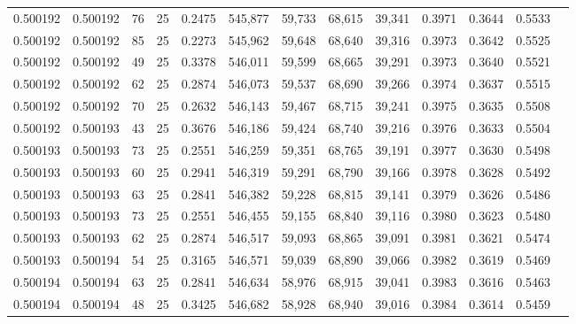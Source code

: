 \begin{tabular}{rrrrrrrrrrrrr}
0.500192 & 0.500192 &    76 &  25 &                                     0.2475 & 545,877 &  59,733 &  68,615 &  39,341 & 0.3971 & 0.3644 & 0.5533 \\
0.500192 & 0.500192 &    85 &  25 &                                     0.2273 & 545,962 &  59,648 &  68,640 &  39,316 & 0.3973 & 0.3642 & 0.5525 \\
0.500192 & 0.500192 &    49 &  25 &                                     0.3378 & 546,011 &  59,599 &  68,665 &  39,291 & 0.3973 & 0.3640 & 0.5521 \\
0.500192 & 0.500192 &    62 &  25 &                                     0.2874 & 546,073 &  59,537 &  68,690 &  39,266 & 0.3974 & 0.3637 & 0.5515 \\
0.500192 & 0.500192 &    70 &  25 &                                     0.2632 & 546,143 &  59,467 &  68,715 &  39,241 & 0.3975 & 0.3635 & 0.5508 \\
0.500192 & 0.500193 &    43 &  25 &                                     0.3676 & 546,186 &  59,424 &  68,740 &  39,216 & 0.3976 & 0.3633 & 0.5504 \\
0.500193 & 0.500193 &    73 &  25 &                                     0.2551 & 546,259 &  59,351 &  68,765 &  39,191 & 0.3977 & 0.3630 & 0.5498 \\
0.500193 & 0.500193 &    60 &  25 &                                     0.2941 & 546,319 &  59,291 &  68,790 &  39,166 & 0.3978 & 0.3628 & 0.5492 \\
0.500193 & 0.500193 &    63 &  25 &                                     0.2841 & 546,382 &  59,228 &  68,815 &  39,141 & 0.3979 & 0.3626 & 0.5486 \\
0.500193 & 0.500193 &    73 &  25 &                                     0.2551 & 546,455 &  59,155 &  68,840 &  39,116 & 0.3980 & 0.3623 & 0.5480 \\
0.500193 & 0.500193 &    62 &  25 &                                     0.2874 & 546,517 &  59,093 &  68,865 &  39,091 & 0.3981 & 0.3621 & 0.5474 \\
0.500193 & 0.500194 &    54 &  25 &                                     0.3165 & 546,571 &  59,039 &  68,890 &  39,066 & 0.3982 & 0.3619 & 0.5469 \\
0.500194 & 0.500194 &    63 &  25 &                                     0.2841 & 546,634 &  58,976 &  68,915 &  39,041 & 0.3983 & 0.3616 & 0.5463 \\
0.500194 & 0.500194 &    48 &  25 &                                     0.3425 & 546,682 &  58,928 &  68,940 &  39,016 & 0.3984 & 0.3614 & 0.5459 \\

\end{tabular}
